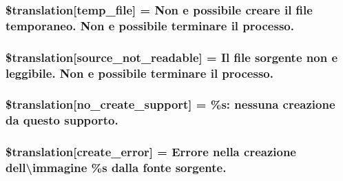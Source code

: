 \subsubsection[{\$translation}]{\setlength{\rightskip}{0pt plus 5cm}\$translation\mbox{[}\textquotesingle{}temp\+\_\+file\textquotesingle{}\mbox{]} = \textquotesingle{}Non e possibile creare il file temporaneo. Non e possibile terminare il processo.\textquotesingle{}}\label{class_8upload_8it___i_t_8php_a2baece8da11e20d45175db91851ec3e3}
\hypertarget{class_8upload_8it___i_t_8php_a922967ca2df0efdd455261142d8e5715}{}
\subsubsection[{\$translation}]{\setlength{\rightskip}{0pt plus 5cm}\$translation\mbox{[}\textquotesingle{}source\+\_\+not\+\_\+readable\textquotesingle{}\mbox{]} = \textquotesingle{}Il file sorgente non e leggibile. Non e possibile terminare il processo.\textquotesingle{}}\label{class_8upload_8it___i_t_8php_a922967ca2df0efdd455261142d8e5715}
\hypertarget{class_8upload_8it___i_t_8php_a346dfd1ade29f583dd20d345c436859f}{}
\subsubsection[{\$translation}]{\setlength{\rightskip}{0pt plus 5cm}\$translation\mbox{[}\textquotesingle{}no\+\_\+create\+\_\+support\textquotesingle{}\mbox{]} = \textquotesingle{}\%s\+: nessuna creazione da questo supporto.\textquotesingle{}}\label{class_8upload_8it___i_t_8php_a346dfd1ade29f583dd20d345c436859f}
\hypertarget{class_8upload_8it___i_t_8php_a53013ce9255c4e1849098ddd9fdb2b3f}{}
\subsubsection[{\$translation}]{\setlength{\rightskip}{0pt plus 5cm}\$translation\mbox{[}\textquotesingle{}create\+\_\+error\textquotesingle{}\mbox{]} = \textquotesingle{}Errore nella creazione dell\textbackslash{}\textquotesingle{}immagine \%s dalla fonte sorgente.\textquotesingle{}}\label{class_8upload_8it___i_t_8php_a53013ce9255c4e1849098ddd9fdb2b3f}
\hypertarget{class_8upload_8it___i_t_8php_a6ab0a660b457eaf2d3434b225449fdd6}{}
